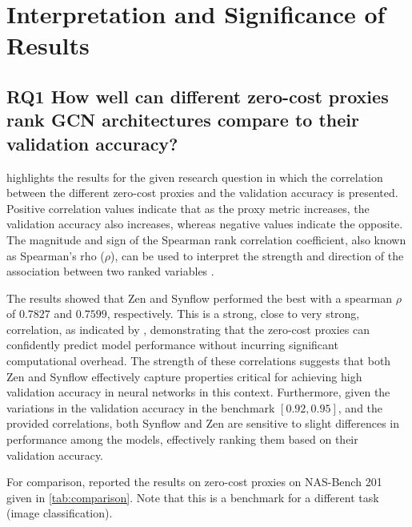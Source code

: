 \section{Interpretation and Significance of Results}

\subsection{RQ1 How well can different zero-cost proxies rank GCN architectures compare to their validation accuracy?}

 highlights the results for the given research question in which the correlation between the different zero-cost proxies and the validation accuracy is presented. Positive correlation values indicate that as the proxy metric increases, the validation accuracy also increases, whereas negative values indicate the opposite. The magnitude and sign of the Spearman rank correlation coefficient, also known as Spearman's rho (\(\rho\)), can be used to interpret the strength and direction of the association between two ranked variables \autocite{pallant2016spss}.

The results showed that Zen and \gls{Synflow} performed the best with a spearman $\rho$ of $0.7827$ and $0.7599$, respectively. This is a strong, close to very strong, correlation, as indicated by \cite{spear}, demonstrating that the zero-cost proxies can confidently predict model performance without incurring significant computational overhead. The strength of these correlations suggests that both Zen and \gls{Synflow} effectively capture properties critical for achieving high validation accuracy in neural networks in this context. Furthermore, given the variations in the validation accuracy in the benchmark $[0.92, 0.95]$, and the provided correlations, both \gls{Synflow} and Zen are sensitive to slight differences in performance among the models, effectively ranking them based on their validation accuracy. 

For comparison, \cite{abdelfattah2021zero} reported the results on zero-cost proxies on NAS-Bench 201 given in \cref{tab:comparison}. Note that this is a benchmark for a different task (image classification).  

